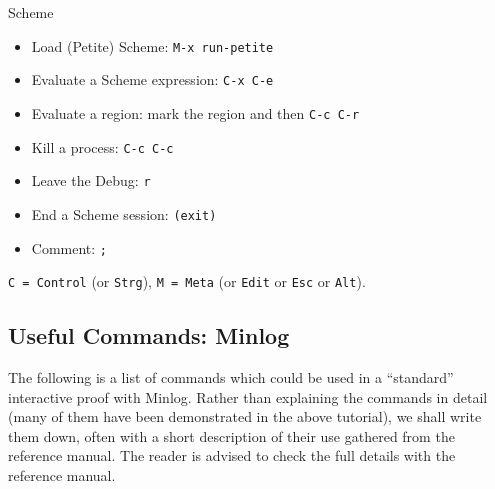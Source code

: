 \documentclass[12pt]{amsart}
\newcommand{\inquotes}[1]{``#1''}
\newcommand{\mi}{Minlog}
\begin{document}
\begin{center}
\begin{large}
Scheme\\
\end{large}
\end{center}
\vspace{3 mm}

\begin{itemize}
\item Load  (Petite) Scheme:  \texttt{M-x run-petite}\\
\item Evaluate a Scheme expression: \texttt{C-x C-e}\\
\item Evaluate a region: mark the region and then \texttt{C-c C-r}\\
\item Kill a process: \texttt{C-c C-c} \\
\item Leave the Debug: \texttt{r}\\
\item End a Scheme session: \texttt{(exit)}\\
\item Comment: \texttt{;}\\
\end{itemize}
\texttt{C = Control} (or \texttt{Strg}), \texttt{M = Meta} (or
\texttt{Edit} or \texttt{Esc} or \texttt{Alt}).


\newpage

\subsection{Useful Commands: \mi}
The following is a list of commands which could be used in a
\inquotes{standard} interactive proof with \mi. Rather than explaining
the commands in detail (many of them have been demonstrated in the
above tutorial), we shall write them down, often with a short
description of their use gathered from the reference manual.  The
reader is advised to check the full details with the reference manual.
\end{document}
